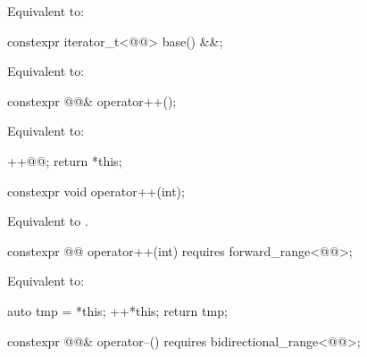 \begin{itemdescr}
\pnum
\effects
Equivalent to: 
\end{itemdescr}

%
\begin{itemdecl}
constexpr iterator_t<@@> base() &&;
\end{itemdecl}

\begin{itemdescr}
\pnum
\effects
Equivalent to: 
\end{itemdescr}

%
\begin{itemdecl}
constexpr @@& operator++();
\end{itemdecl}

\begin{itemdescr}
\pnum
\effects
Equivalent to:
\begin{codeblock}
++@@;
return *this;
\end{codeblock}
\end{itemdescr}

%
\begin{itemdecl}
constexpr void operator++(int);
\end{itemdecl}

\begin{itemdescr}
\pnum
\effects
Equivalent to .
\end{itemdescr}

%
\begin{itemdecl}
constexpr @@ operator++(int) requires forward_range<@@>;
\end{itemdecl}

\begin{itemdescr}
\pnum
\effects
Equivalent to:
\begin{codeblock}
auto tmp = *this;
++*this;
return tmp;
\end{codeblock}
\end{itemdescr}

%
\begin{itemdecl}
constexpr @@& operator--() requires bidirectional_range<@@>;
\end{itemdecl}

